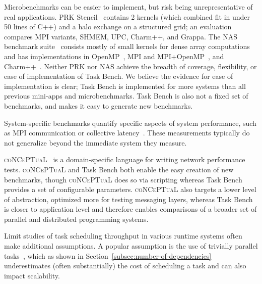 Microbenchmarks can be easier to implement, but risk being
unrepresentative of real applications. PRK Stencil~\cite{PRK14}
contains 2 kernels (which combined fit in under 50 lines of C++)
and a halo exchange on a structured grid; an
evaluation~\cite{PRKRuntimes16} compares MPI variants, SHMEM, UPC,
Charm++, and Grappa. The NAS benchmark suite~\cite{NAS91, NAS95}
consists mostly of small kernels for dense array computations and has
implementations in OpenMP~\cite{NASOpenMP99}, MPI and
MPI+OpenMP~\cite{NASMPIOpenMP00}, and
Charm++~\cite{NASCharm96}. Neither PRK nor NAS achieve the breadth of
coverage, flexibility, or ease of implementation of Task Bench. We
believe the evidence for ease of implementation is clear; Task Bench
is implemented for more systems than all previous mini-apps and
microbenchmarks. Task Bench is also not a fixed set of benchmarks, and
makes it easy to generate new benchmarks.

System-specific benchmarks quantify specific aspects
of system performance, such as MPI communication or collective
latency~\cite{MPPTest99, MPIBench01}. These measurements typically do
not generalize beyond the immediate system they measure.

\textsc{coNCePTuaL}~\cite{Conceptual07} is a domain-specific language
for writing network performance tests. \textsc{coNCePTuaL} and Task
Bench both enable the easy creation of new benchmarks, though
\textsc{coNCePTuaL} does so via scripting whereas Task Bench provides
a set of configurable parameters. \textsc{coNCePTuaL} also targets a
lower level of abstraction, optimized more for testing messaging
layers, whereas Task Bench is closer to application level and
therefore enables comparisons of a broader set of parallel and
distributed programming systems.

Limit studies of task scheduling throughput in various runtime systems
often make additional assumptions. A popular assumption is the use of
trivially parallel tasks~\cite{Canary16, Armstrong14}, which as shown
in Section~\ref{subsec:number-of-dependencies} underestimates (often
substantially) the cost of scheduling a task and can also impact scalability.
